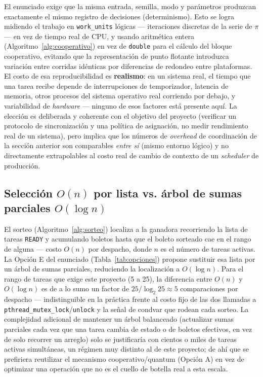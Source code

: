 El enunciado exige que la misma entrada, semilla, modo y parámetros
produzcan exactamente el mismo registro de decisiones (determinismo). Esto
se logra midiendo el trabajo en \texttt{work\_units} lógicas --- iteraciones
discretas de la serie de $\pi$ --- en vez de tiempo real de CPU, y usando
aritmética entera (Algoritmo~\ref{alg:cooperativo}) en vez de \texttt{double}
para el cálculo del bloque cooperativo, evitando que la representación de
punto flotante introduzca variación entre corridas idénticas por diferencias
de redondeo entre plataformas. El costo de esa reproducibilidad es
\textbf{realismo}: en un sistema real, el tiempo que una tarea recibe
depende de interrupciones de temporizador, latencia de memoria, otros
procesos del sistema operativo real corriendo por debajo, y variabilidad de
\textit{hardware} --- ninguno de esos factores está presente aquí. La
elección es deliberada y coherente con el objetivo del proyecto (verificar
un protocolo de sincronización y una política de asignación, no medir
rendimiento real de un sistema), pero implica que los números de
\textit{overhead} de coordinación de la sección anterior son comparables
\emph{entre sí} (mismo entorno lógico) y no directamente extrapolables al
costo real de cambio de contexto de un \textit{scheduler} de producción.

\subsection{Selección $O(n)$ por lista vs. árbol de sumas parciales $O(\log n)$}

El sorteo (Algoritmo~\ref{alg:sorteo}) localiza a la ganadora recorriendo la
lista de tareas \texttt{READY} y acumulando boletos hasta que el boleto
sorteado cae en el rango de alguna --- costo $O(n)$ por despacho, donde $n$
es el número de tareas activas. La Opción E del enunciado
(Tabla~\ref{tab:opciones}) propone sustituir esa lista por un árbol de sumas
parciales, reduciendo la localización a $O(\log n)$. Para el rango de
tareas que exige este proyecto (5 a 25), la diferencia entre $O(n)$ y
$O(\log n)$ es de a lo sumo un factor de $25/\log_2 25 \approx 5$
comparaciones por despacho --- indistinguible en la práctica frente al costo
fijo de las dos llamadas a \texttt{pthread\_mutex\_lock}/\texttt{unlock} y
la señal de condvar que rodean cada sorteo. La complejidad adicional de
mantener un árbol balanceado (actualizar sumas parciales cada vez que una
tarea cambia de estado o de boletos efectivos, en vez de solo recorrer un
arreglo) solo se justificaría con cientos o miles de tareas activas
simultáneas, un régimen muy distinto al de este proyecto; de ahí que se
prefiriera reutilizar el mecanismo cooperativo/quantum (Opción A) en vez de
optimizar una operación que no es el cuello de botella real a esta escala.

